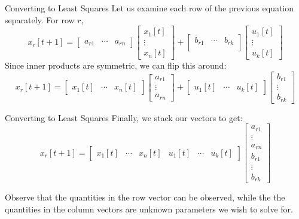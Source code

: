 \begin{frame}{Converting to Least Squares}
	Let us examine each row of the previous equation separately. For row $r$, 
	\[
		x_r[t+1]
		=
		\begin{bmatrix}
			a_{r1} & \cdots & a_{rn}   
		\end{bmatrix}
		\begin{bmatrix}
			x_1[t] \\
			\vdots \\
			x_n[t] 
		\end{bmatrix}
		+
		\begin{bmatrix}
			b_{r1} & \cdots & b_{rk} \\  
		\end{bmatrix}        
		\begin{bmatrix}
			u_1[t] \\
			\vdots \\
			u_k[t] 
		\end{bmatrix}
    \]
    Since inner products are symmetric, we can flip this around:
	\[
		x_r[t+1]
		=
		\begin{bmatrix}
			x_1[t] & \cdots & x_n[t] 	
		\end{bmatrix}
		\begin{bmatrix}
			a_{r1} \\ 
			\vdots \\
			a_{rn}   
		\end{bmatrix}
		+   
		\begin{bmatrix}
			u_1[t] & \cdots & u_k[t]
		\end{bmatrix}
		\begin{bmatrix}
			b_{r1} \\ 
			\vdots \\
			b_{rk} 
		\end{bmatrix}     
    \]    
\end{frame}
	
\begin{frame}{Converting to Least Squares}
	Finally, we stack our vectors to get:
	\[
		x_r[t+1]
		=
		\begin{bmatrix}
			x_1[t] & \cdots & x_n[t] & u_1[t] & \cdots & u_k[t]
		\end{bmatrix}
		\begin{bmatrix}
			a_{r1} \\ 
			\vdots \\
			a_{rn} \\
			b_{r1} \\ 
			\vdots \\
			b_{rk} 
		\end{bmatrix}
	\]
	
	Observe that the quantities in the row vector can be observed, while the the quantities in the column vectors are unknown parameters we wish to solve for.
\end{frame}
	

